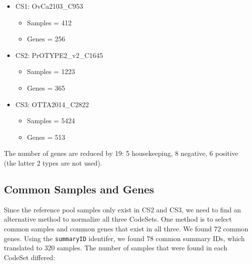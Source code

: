 \documentclass[
]{report}
\providecommand{\tightlist}{%
  \setlength{\itemsep}{0pt}\setlength{\parskip}{0pt}}
\begin{document}
\begin{itemize}
\tightlist
\item
  CS1: OvCa2103\_C953

  \begin{itemize}
  \tightlist
  \item
    Samples = 412
  \item
    Genes = 256
  \end{itemize}
\item
  CS2: PrOTYPE2\_v2\_C1645

  \begin{itemize}
  \tightlist
  \item
    Samples = 1223
  \item
    Genes = 365
  \end{itemize}
\item
  CS3: OTTA2014\_C2822

  \begin{itemize}
  \tightlist
  \item
    Samples = 5424
  \item
    Genes = 513
  \end{itemize}
\end{itemize}

The number of genes are reduced by 19: 5 housekeeping, 8 negative, 6 positive (the latter 2 types are not used).

\hypertarget{common-samples-and-genes}{%
\subsection{Common Samples and Genes}\label{common-samples-and-genes}}

Since the reference pool samples only exist in CS2 and CS3, we need to find an alternative method to normalize all three CodeSets. One method is to select common samples and common genes that exist in all three. We found 72 common genes. Using the \texttt{summaryID} identifer, we found 78 common summary IDs, which translated to 320 samples. The number of samples that were found in each CodeSet differed:
\end{document}

